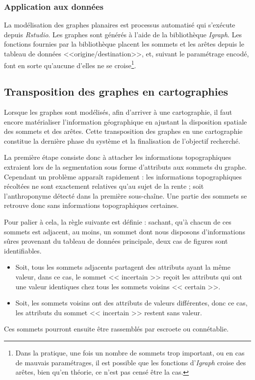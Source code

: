 \subsubsection{Application aux données}
La modélisation des graphes planaires est processus automatisé qui s'exécute depuis \textit{Rstudio}. Les graphes sont générés à l'aide de la bibliothèque \textit{Igraph}. Les fonctions fournies par la bibliothèque placent les sommets et les arêtes depuis le tableau de données <<origine/destination>>, et, suivant le paramétrage encodé, font en sorte qu'aucune d'elles ne se croise\footnote{Dans la pratique, une fois un nombre de sommets trop important, ou en cas de mauvais paramétrages, il est possible que les fonctions d'\textit{Igraph} croise des arêtes, bien qu'en théorie, ce n'est pas censé être la cas.}. 

\subsection{Transposition des graphes en cartographies}
Lorsque les graphes sont modélisés, afin d'arriver à une cartographie, il faut encore matérialiser l'information géographique en ajustant la disposition spatiale des sommets et des arêtes. Cette transposition des graphes en une cartographie constitue la dernière phase du système et la finalisation de l'objectif recherché. 

La première étape consiste donc à attacher les informations topographiques extraient lors de la segmentation sous forme d'attributs aux sommets du graphe. Cependant un problème apparaît rapidement : les informations topographiques récoltées ne sont exactement relatives qu'au sujet de la rente ; soit l'anthroponyme détecté dans la première sous-chaîne. Une partie des sommets se retrouve donc sans informations topographiques certaines. 

Pour palier à cela, la règle suivante est définie : sachant, qu'à chacun de ces sommets est adjacent, au moins, un sommet dont  nous disposons d'informations sûres provenant du tableau de données principale, deux cas de figures sont identifiables.
\begin{itemize}
    \item Soit, tous les sommets adjacents partagent des attributs ayant la même valeur, dans ce cas,  le sommet << incertain >> reçoit les attributs qui ont une valeur identiques chez tous les sommets voisins << certain >>.
    \item Soit, les sommets voisins ont des attributs de valeurs différentes, donc ce cas, les attributs du sommet << incertain >>  restent sans valeur.
\end{itemize}
Ces sommets pourront ensuite être rassemblés par escroete ou connétablie.

